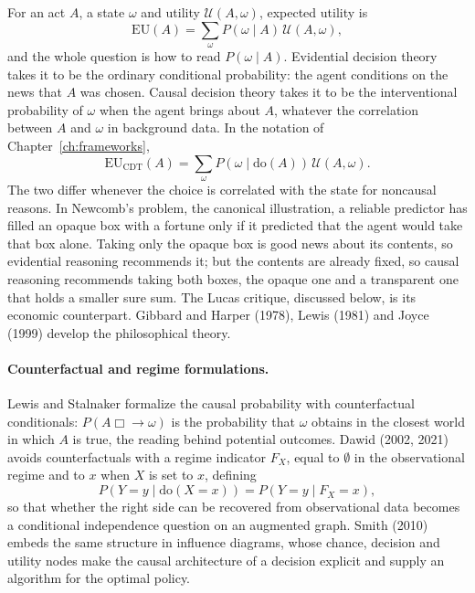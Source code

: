 For an act $A$, a state $\omega$ and utility $\mathcal{U}(A,\omega)$, expected utility is
\begin{equation}\label{cdt:eq:eu}
\mathrm{EU}(A) = \sum_{\omega} P(\omega \mid A)\, \mathcal{U}(A, \omega),
\end{equation}
and the whole question is how to read $P(\omega \mid A)$. Evidential decision theory takes it to be the ordinary conditional probability: the agent conditions on the news that $A$ was chosen. Causal decision theory takes it to be the interventional probability of $\omega$ when the agent brings about $A$, whatever the correlation between $A$ and $\omega$ in background data. In the notation of Chapter~\ref{ch:frameworks},
\[
\mathrm{EU}_{\mathrm{CDT}}(A) = \sum_\omega P(\omega \mid \mathrm{do}(A))\,\mathcal{U}(A,\omega).
\]
The two differ whenever the choice is correlated with the state for noncausal reasons. In Newcomb's problem, the canonical illustration, a reliable predictor has filled an opaque box with a fortune only if it predicted that the agent would take that box alone. Taking only the opaque box is good news about its contents, so evidential reasoning recommends it; but the contents are already fixed, so causal reasoning recommends taking both boxes, the opaque one and a transparent one that holds a smaller sure sum. The Lucas critique, discussed below, is its economic counterpart. Gibbard and Harper (1978), Lewis (1981) and Joyce (1999) develop the philosophical theory.

\paragraph{Counterfactual and regime formulations.} Lewis and Stalnaker formalize the causal probability with counterfactual conditionals: $P(A \mathbin{\Box\!\!\to} \omega)$ is the probability that $\omega$ obtains in the closest world in which $A$ is true, the reading behind potential outcomes. Dawid (2002, 2021) avoids counterfactuals with a regime indicator $F_X$, equal to $\emptyset$ in the observational regime and to $x$ when $X$ is set to $x$, defining
\[
P(Y = y \mid \mathrm{do}(X = x)) = P(Y = y \mid F_X = x),
\]
so that whether the right side can be recovered from observational data becomes a conditional independence question on an augmented graph. Smith (2010) embeds the same structure in influence diagrams, whose chance, decision and utility nodes make the causal architecture of a decision explicit and supply an algorithm for the optimal policy.

